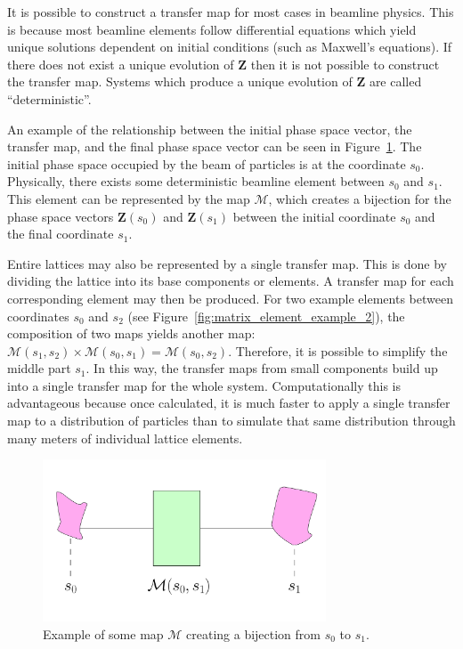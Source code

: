 It is possible to construct a transfer map for most cases in beamline physics. This is because most beamline elements follow differential equations which yield unique solutions dependent on initial conditions (such as Maxwell's equations). If there does not exist a unique evolution of $\mathbf{Z}$ then it is not possible to construct the transfer map. Systems which produce a unique evolution of $\mathbf{Z}$ are called ``deterministic''.

An example of the relationship between the initial phase space vector, the transfer map, and the final phase space vector can be seen in Figure~\ref{fig:matrix_element_example_1}. The initial phase space occupied by the beam of particles is at the coordinate $s_0$. Physically, there exists some deterministic beamline element between $s_0$ and $s_1$. This element can be represented by the map $\mathcal{M}$, which creates a bijection for the phase space vectors $\mathbf{Z}(s_0)$ and $\mathbf{Z}(s_1)$ between the initial coordinate $s_0$ and the final coordinate $s_1$. 

Entire lattices may also be represented by a single transfer map. This is done by dividing the lattice into its base components or elements. A transfer map for each corresponding element may then be produced. For two example elements between coordinates $s_0$ and $s_2$ (see Figure~\ref{fig:matrix_element_example_2}), the composition of two maps yields another map: $\mathcal{M}(s_1 , s_2)\times \mathcal{M}(s_0 , s_1) = \mathcal{M}(s_0 , s_2)$.  Therefore, it is possible to simplify the middle part $s_1$. In this way, the transfer maps from small components build up into a single transfer map for the whole system. Computationally this is advantageous because once calculated, it is much faster to apply a single transfer map to a distribution of particles than to simulate that same distribution through many meters of individual lattice elements.

\begin{figure}[h!]
  \centering
    \includegraphics[width=0.75\textwidth]{Figures/matrix_element_example_1} 
  \caption{Example of some map $\mathcal{M}$ creating a bijection from $s_0$ to $s_1$.}
  \label{fig:matrix_element_example_1}
\end{figure}

